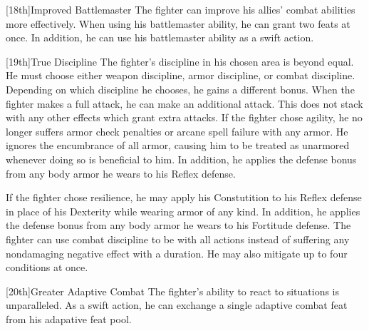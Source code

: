 [18th]{Improved Battlemaster}
The fighter can improve his allies' combat abilities more effectively.
When using his battlemaster ability, he can grant two feats at once.
In addition, he can use his battlemaster ability as a swift action.

[19th]{True Discipline}
The fighter's discipline in his chosen area is beyond equal.
He must choose either weapon discipline, armor discipline, or combat discipline.
Depending on which discipline he chooses, he gains a different bonus.
When the fighter makes a full attack, he can make an additional attack.
This does not stack with any other effects which grant extra attacks.
If the fighter chose agility, he no longer suffers armor check penalties or arcane spell failure with any armor.
He ignores the encumbrance of all armor, causing him to be treated as unarmored whenever doing so is beneficial to him.
In addition, he applies the defense bonus from any body armor he wears to his Reflex defense.

If the fighter chose resilience, he may apply his Constutition to his Reflex defense in place of his Dexterity while wearing armor of any kind.
In addition, he applies the defense bonus from any body armor he wears to his Fortitude defense.
The fighter can use combat discipline to be \impaired with all actions instead of suffering any nondamaging negative effect with a duration.
He may also mitigate up to four conditions at once.

[20th]{Greater Adaptive Combat}
The fighter's ability to react to situations is unparalleled.
As a swift action, he can exchange a single adaptive combat feat from his adapative feat pool.

